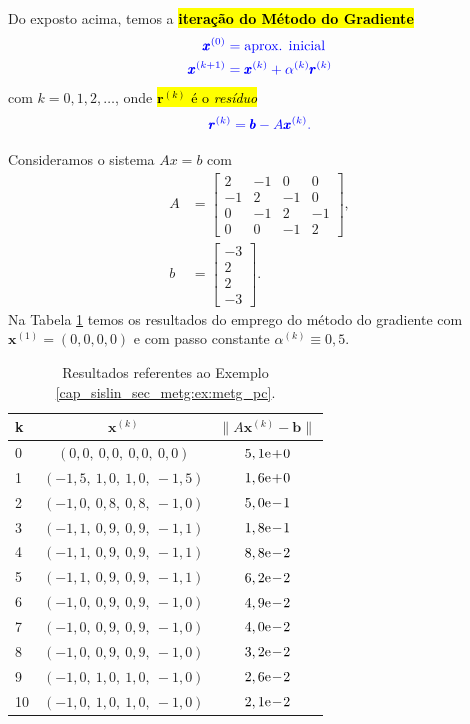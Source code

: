 Do exposto acima, temos a \hl{\textbf{iteração do Método do Gradiente}}
\begin{equation}\color{blue}\begin{aligned}
    \pmb{x}^{(0)} &= \text{aprox. inicial}\\
    \pmb{x}^{(k+1)} &= \pmb{x}^{(k)} + \alpha^{(k)}\pmb{r}^{(k)}
  \end{aligned}
\end{equation}
com $k = 0, 1, 2, \ldots$, onde \hl{$\pmb{r}^{(k)}$ é o \emph{resíduo}}
\begin{equation}\color{blue}\pmb{r}^{(k)} = \pmb{b} - A\pmb{x}^{(k)}.
\end{equation}

\begin{ex}\label{cap_sislin_sec_metg:ex:metg_pc}
  Consideramos o sistema $Ax = b$ com
  \begin{align}
    A &=
    \begin{bmatrix}
      2 & -1 & 0 & 0\\
      -1 & 2 & -1 & 0\\
      0 & -1 & 2 & -1 \\
      0 & 0 & -1 & 2
    \end{bmatrix},\\
    b &=
    \begin{bmatrix}
      -3\\
      2\\
      2\\
      -3
    \end{bmatrix}.
  \end{align}
  Na Tabela \ref{cap_sislin_sec_metg:tab:metg_pc} temos os resultados do emprego do método do gradiente com $\pmb{x}^{(1)} = (0, 0, 0, 0)$ e com passo constante $\alpha^{(k)}\equiv 0,5$.

  \begin{table}[H]
    \centering
    \caption{Resultados referentes ao Exemplo \ref{cap_sislin_sec_metg:ex:metg_pc}.}
    \label{cap_sislin_sec_metg:tab:metg_pc}
    \begin{tabular}{l|c|c}
      k & $\pmb{x}^{(k)}$ & $\|A\pmb{x}^{(k)}-\pmb{b}\|$\\\hline
      0 & $(0,0,~0,0,~0,0,~0,0)$ & $5,1\mathrm{e}\!+\!0$\\
      1 & $(-1,5,~1,0,~1,0,~-1,5)$ & $1,6\mathrm{e}\!+\!0$\\
      2 & $(-1,0,~0,8,~0,8,~-1,0)$ & $5,0\mathrm{e}\!-\!1$\\
      3 & $(-1,1,~0,9,~0,9,~-1,1)$ & $1,8\mathrm{e}\!-\!1$\\
      4 & $(-1,1,~0,9,~0,9,~-1,1)$ & $8,8\mathrm{e}\!-\!2$\\
      5 & $(-1,1,~0,9,~0,9,~-1,1)$ & $6,2\mathrm{e}\!-\!2$\\
      6 & $(-1,0,~0,9,~0,9,~-1,0)$ & $4,9\mathrm{e}\!-\!2$\\
      7 & $(-1,0,~0,9,~0,9,~-1,0)$ & $4,0\mathrm{e}\!-\!2$\\
      8 & $(-1,0,~0,9,~0,9,~-1,0)$ & $3,2\mathrm{e}\!-\!2$\\
      9 & $(-1,0,~1,0,~1,0,~-1,0)$ & $2,6\mathrm{e}\!-\!2$\\
      10 & $(-1,0,~1,0,~1,0,~-1,0)$ & $2,1\mathrm{e}\!-\!2$\\\hline
    \end{tabular}
  \end{table}


\end{ex}

